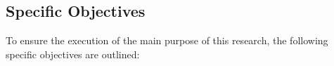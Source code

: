 \subsection{Specific Objectives}

To ensure the execution of the main purpose of this research, the following specific objectives are outlined:

